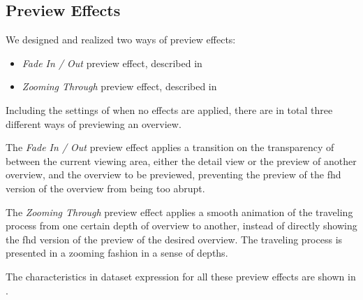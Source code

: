 \subsection{Preview Effects}

We designed and realized two ways of preview effects:

\begin{itemize}
    \item \emph{Fade In / Out} preview effect, described in 
    \item \emph{Zooming Through} preview effect, described in 
\end{itemize}

Including the settings of when no effects are applied, there are in total three different ways of previewing an overview. 

The \emph{Fade In / Out} preview effect applies a transition on the transparency of between the current viewing area, either the detail view or the preview of another overview, and the overview to be previewed, preventing the preview of the \gls{fhd} version of the overview from being too abrupt.

The \emph{Zooming Through} preview effect applies a smooth animation of the traveling process from one certain depth of overview to another, instead of directly showing the \gls{fhd} version of the preview of the desired overview. The traveling process is presented in a zooming fashion in a sense of depths.

The characteristics in dataset expression for all these preview effects are shown in .

